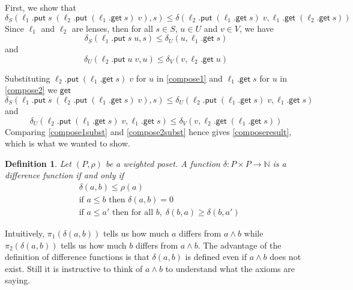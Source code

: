 \documentclass[acmsmall,review,anonymous]{acmart}\settopmatter{printfolios=true,printccs=false,printacmref=false}
\newtheorem{definition}{Definition}
\newcommand{\kw}[1]{\ensuremath{\mathsf{#1}}}
\newcommand{\get}{\ensuremath{\kw{get}}}
\newcommand{\pput}{\ensuremath{\kw{put}}}
\begin{document}
First, we show that
\begin{equation}\label{composeresult}
\delta_S(\ell_1.\pput \; s \; (\ell_2.\pput \; (\ell_1.\get \; s) \; v), s) \leq
\delta(\ell_2.\pput \; (\ell_1.\get \; s) \; v, \ell_1.\get \;(\ell_2.\get
\; s))
\end{equation}
Since $\ell_1$ and $\ell_2$ are lenses, then for all $s \in S$, $u \in U$ and $v
\in V$, we have
\begin{equation}\label{compose1}
\delta_S(\ell_1.\pput \; s \; u, s) \leq \delta_U(u, \ell_1.\get \; s)
\end{equation}
and
\begin{equation}\label{compose2}
\delta_U(\ell_2.\pput \; u \; v, u) \leq \delta_V(v, \ell_2.\get \; u)
\end{equation}

\noindent Substituting $\ell_2.\pput \; (\ell_1.\get \; s) \; v$ for $u$ in
\cref{compose1} and $\ell_1.\get \; s$ for $u$ in \cref{compose2} we \get
\begin{equation}\label{compose1subst}
\delta_S(\ell_1.\pput \; s \; (\ell_2.\pput \; (\ell_1.\get \; s) \; v), s) \leq
\delta_U(\ell_2.\pput \; (\ell_1.\get \; s) \; v, \ell_1.\get
\; s)
\end{equation}
and
\begin{equation}\label{compose2subst}
\delta_U(\ell_2.\pput \; (\ell_1.\get \; s) \; v, \ell_1.\get \; s) \leq
\delta_V(v, \ell_2.\get \; (\ell_1.\get \; s))
\end{equation}
Comparing \cref{compose1subst} and \cref{compose2subst} hence gives
\cref{composeresult}, which is what we wanted to show.

\iffalse

\begin{definition}
Let $(P, \rho)$ be a weighted poset. A function $\delta : P
\times P \longrightarrow \mathbb{N}$ is a difference function if and
only if
\begin{align*}
&\delta(a, b) \leq \rho(a) \tag{A1}\\
&\text{if } a \leq b \text{ then } \delta(a, b) = 0 \tag{A2}\\
&\text{if } a \leq a' \text{ then for all }b , \; \delta(b, a) \geq \delta(b,
a')\tag{A3}
\end{align*}
\end{definition}
\iffalse
Intuitively, $\pi_1(\delta(a, b))$ tells us how much $a$ differs from $a \wedge
b$ while $\pi_2(\delta(a, b))$ tells us how much $b$ differs from $a \wedge b$.
The advantage of the definition of difference functions is that $\delta(a, b)$
is defined even if $a \wedge b$ does not exist. Still it is instructive to
think of $a \wedge b$ to understand what the axioms are saying.
\end{document}
